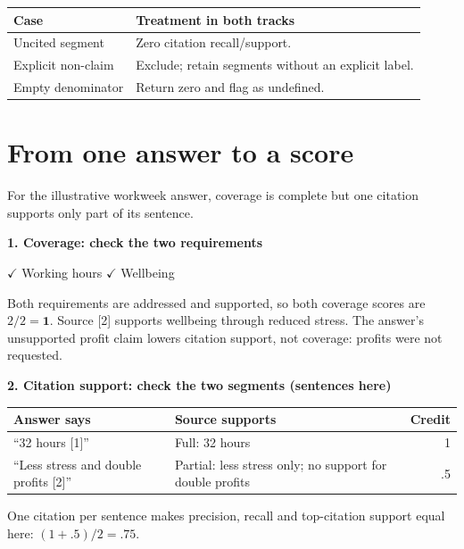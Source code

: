 \documentclass[11pt,letterpaper]{article}
\begin{document}
\begin{center}
\begin{tabularx}{\linewidth}{@{}lY@{}}\toprule
Case & Treatment in both tracks\\\midrule
Uncited segment & Zero citation recall/support.\\
Explicit non-claim & Exclude; retain segments without an explicit label.\\
Empty denominator & Return zero and flag as undefined.\\\bottomrule
\end{tabularx}
\end{center}

\clearpage
\setlength{\extrarowheight}{0pt}
\section{From one answer to a score}
For the illustrative workweek answer, coverage is complete but one citation supports only part of its sentence.

\textbf{1. Coverage: check the two requirements}
\begin{center}
\textcolor{decisiongreen}{$\checkmark$} Working hours \qquad
\textcolor{decisiongreen}{$\checkmark$} Wellbeing
\end{center}
Both requirements are addressed and supported, so both coverage scores are $2/2=\mathbf{1}$. Source [2] supports wellbeing through reduced stress. The answer's unsupported profit claim lowers citation support, not coverage: profits were not requested.

\textbf{2. Citation support: check the two segments (sentences here)}
\begin{center}
\renewcommand{\arraystretch}{1.15}
\begin{tabularx}{\linewidth}{@{}YYr@{}}\toprule
Answer says & Source supports & Credit\\\midrule
``32 hours [1]'' & \textcolor{decisiongreen}{Full:} 32 hours & 1\\[3pt]
``Less stress and double profits [2]'' & \textcolor{reviewamber}{Partial:} less stress only; no support for double profits & .5\\\bottomrule
\end{tabularx}
\end{center}
One citation per sentence makes precision, recall and top-citation support equal here: $(1+.5)/2=\mathbf{.75}$.
\end{document}
